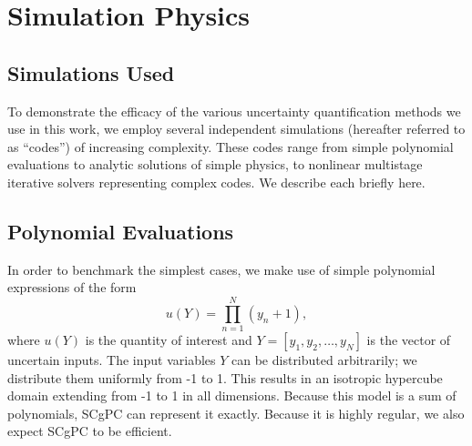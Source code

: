 
\chapter{Simulation Physics} %

\label{ch:models} %



\section{Simulations Used}
To demonstrate the efficacy of the various uncertainty quantification methods we use in this work, we employ
several independent simulations (hereafter referred to as ``codes'') of increasing complexity.  These codes
range from simple polynomial evaluations to analytic solutions of simple physics, to nonlinear multistage
iterative solvers representing complex codes.  We describe each briefly here.


\section{Polynomial Evaluations}
In order to benchmark the simplest cases, we make use of simple polynomial expressions of the form
\begin{equation}
  u(Y) = \prod_{n=1}^N (y_n+1),
\end{equation}
where $u(Y)$ is the quantity of interest and $Y=[y_1,y_2,\ldots,y_N]$ is the vector of uncertain inputs.
The input variables $Y$ can be distributed arbitrarily; we distribute them uniformly from -1 to 1.  This
results in an isotropic hypercube domain extending from -1 to 1 in all dimensions.  
Because this model is a sum of polynomials, SCgPC can represent it exactly.  Because it is highly regular, we
also expect SCgPC to be efficient.





